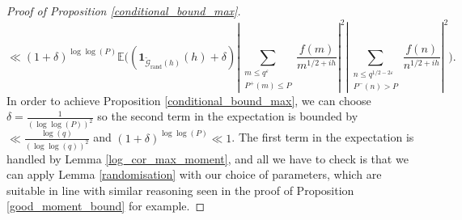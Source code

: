\documentclass[reqno]{amsart}
\theoremstyle{definition}
\theoremstyle{remark}
\numberwithin{equation}{section}
\theoremstyle{remark}
\begin{document}
\begin{proof}[Proof of Proposition \ref{conditional_bound_max}]
$$\ll (1+\delta)^{\log\log(P)}\mathbb{E}\big((\mathbf{1}_{\widetilde{\mathcal{G}}_{\text{rand}}(h)}(h)+\delta)|\sum_{\substack{m \leq q^\varepsilon \\ P^+(m)\leq P}}\frac{f(m)}{m^{1/2+ih}}|^2|\sum_{\substack{n \leq q^{1/2-2\varepsilon} \\ P^-(n) > P}}\frac{f(n)}{n^{1/2+ih}}|^2\big).$$
In order to achieve Proposition \ref{conditional_bound_max}, we can choose $\delta = \frac{1}{(\log\log(P))^2}$ so the second term in the expectation is bounded by $\ll \frac{\log(q)}{(\log\log(q))^2}$ and $(1+\delta)^{\log\log(P)} \ll 1$. The first term in the expectation is handled by Lemma \ref{log_cor_max_moment}, and all we have to check is that we can apply Lemma \ref{randomisation} with our choice of parameters, which are suitable in line with similar reasoning seen in the proof of Proposition \ref{good_moment_bound} for example.
\end{proof}
\printbibliography[title= References]
\end{document}

